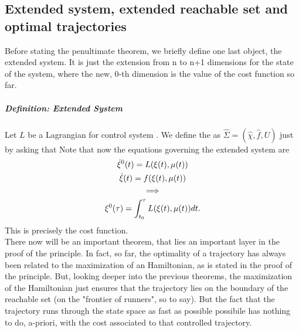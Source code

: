 \subsection{Extended system, extended reachable set and optimal trajectories}
Before stating the penultimate theorem, we briefly define one last object, the extended system. It is just the extension from n to n+1 dimensions for the state of the system, where the new, 0-th dimension is the value of the cost function so far.

\subparagraph[6.1]{Definition: Extended System} Let $L$ be a Lagrangian for control system \controlSystem. We define the  as $\hat{\Sigma}=(\hat\chi,\hat{f},U)$ just by asking that 
Note that now the equations governing the extended system are 
\begin{gather*}
	 \dot{\xi}^0(t)=L(\xi (t),\mu(t))\\
	\dot{\xi}(t)=f(\xi (t),\mu(t))\\
	\implies\\
	\xi^0(\tau)=\int_{t_0}^{\tau}L(\xi (t),\mu(t))dt.
\end{gather*}
This is precisely the cost function.\\
There now will be an important theorem, that lies an important layer in the proof of the principle. In fact, so far, the optimality of a trajectory has always been related to the maximization of an Hamiltonian, as is stated in the proof of the principle. But, looking deeper into the previous theorems, the maximization of the Hamiltonian just ensures that the trajectory lies on the boundary of the reachable set (on the "frontier of runners", so to say). But the fact that the trajectory runs through the state space as fast as possible possibile has nothing to do, a-priori, with the cost associated to that controlled trajectory. 


